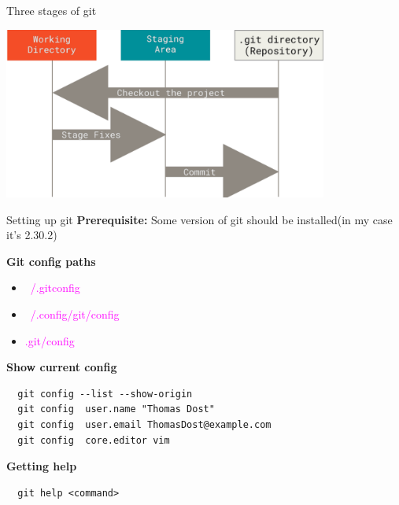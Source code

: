 \documentclass{beamer}
\begin{document}
\begin{frame}[fragile,t]{Three stages of git }
  \begin{center}
    \centering
  \includegraphics[width=0.8\textwidth,height=0.7\textheight]{screenshots/2022-03-27-113647_1159x614_scrot.png}
  \end{center}
\end{frame}

\begin{frame}[fragile,t]{Setting up git}
  \textbf{Prerequisite:} Some version of git should be installed(in my case it's 2.30.2)\vspace{10pt}
  
  
  \textbf{Git config paths}
  \begin{itemize}
    \item \textcolor{magenta}{~/.gitconfig} 
    \item \textcolor{magenta}{~/.config/git/config}
    \item \textcolor{magenta}{.git/config}
  \end{itemize} 
  \vspace{10pt}
  \textbf{Show current config}
  \begin{lstlisting}
  git config --list --show-origin
  git config  user.name "Thomas Dost"
  git config  user.email ThomasDost@example.com
  git config  core.editor vim\end{lstlisting}
  \vspace{10pt}
  \textbf{Getting help}
  \begin{lstlisting}
  git help <command>\end{lstlisting}
\end{frame}
\end{document}
